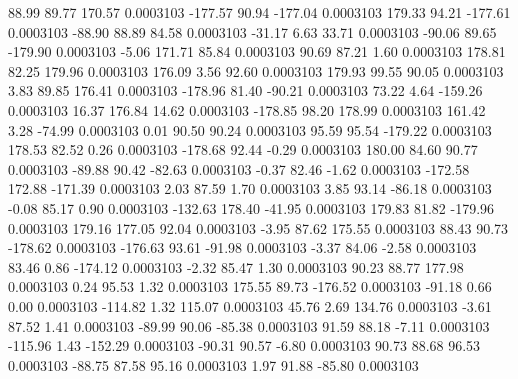        88.99       89.77      170.57     0.0003103
     -177.57       90.94     -177.04     0.0003103
      179.33       94.21     -177.61     0.0003103
      -88.90       88.89       84.58     0.0003103
      -31.17        6.63       33.71     0.0003103
      -90.06       89.65     -179.90     0.0003103
       -5.06      171.71       85.84     0.0003103
       90.69       87.21        1.60     0.0003103
      178.81       82.25      179.96     0.0003103
      176.09        3.56       92.60     0.0003103
      179.93       99.55       90.05     0.0003103
        3.83       89.85      176.41     0.0003103
     -178.96       81.40      -90.21     0.0003103
       73.22        4.64     -159.26     0.0003103
       16.37      176.84       14.62     0.0003103
     -178.85       98.20      178.99     0.0003103
      161.42        3.28      -74.99     0.0003103
        0.01       90.50       90.24     0.0003103
       95.59       95.54     -179.22     0.0003103
      178.53       82.52        0.26     0.0003103
     -178.68       92.44       -0.29     0.0003103
      180.00       84.60       90.77     0.0003103
      -89.88       90.42      -82.63     0.0003103
       -0.37       82.46       -1.62     0.0003103
     -172.58      172.88     -171.39     0.0003103
        2.03       87.59        1.70     0.0003103
        3.85       93.14      -86.18     0.0003103
       -0.08       85.17        0.90     0.0003103
     -132.63      178.40      -41.95     0.0003103
      179.83       81.82     -179.96     0.0003103
      179.16      177.05       92.04     0.0003103
       -3.95       87.62      175.55     0.0003103
       88.43       90.73     -178.62     0.0003103
     -176.63       93.61      -91.98     0.0003103
       -3.37       84.06       -2.58     0.0003103
       83.46        0.86     -174.12     0.0003103
       -2.32       85.47        1.30     0.0003103
       90.23       88.77      177.98     0.0003103
        0.24       95.53        1.32     0.0003103
      175.55       89.73     -176.52     0.0003103
      -91.18        0.66        0.00     0.0003103
     -114.82        1.32      115.07     0.0003103
       45.76        2.69      134.76     0.0003103
       -3.61       87.52        1.41     0.0003103
      -89.99       90.06      -85.38     0.0003103
       91.59       88.18       -7.11     0.0003103
     -115.96        1.43     -152.29     0.0003103
      -90.31       90.57       -6.80     0.0003103
       90.73       88.68       96.53     0.0003103
      -88.75       87.58       95.16     0.0003103
        1.97       91.88      -85.80     0.0003103
